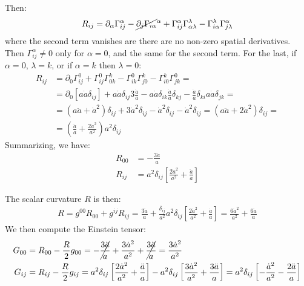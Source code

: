 \documentclass[../template.tex]{subfiles}
\begin{document}
Then:
\begin{align*}
    R_{ij} = \partial_\alpha \Gamma_{ij}^\alpha -\cancel{\partial_j \Gamma_{i \alpha}}^\alpha + \Gamma_{ij}^\alpha \Gamma_{\alpha \lambda}^\lambda - \Gamma_{i \alpha}^\lambda \Gamma_{j \lambda}^\alpha
\end{align*}
where the second term vanishes are there are no non-zero spatial derivatives. Then $\Gamma_{ij}^\alpha \neq 0$ only for $\alpha = 0$, and the same for the second term. For the last, if $\alpha = 0$, $\lambda = k$, or if $\alpha = k$ then $\lambda = 0$:
\begin{align*}
    R_{ij} &= \partial_0 \Gamma^0_{ij} + \Gamma_{ij}^0 \Gamma_{0k}^k - \Gamma_{ik}^0 \Gamma_{j0}^k - \Gamma_{i0}^k \Gamma_{jk}^0 = \\
    &= \partial_0 [a \dot{a} \delta_{ij}] + a \dot{a} \delta_{ij} 3 \frac{\dot{a}}{a} - a \dot{a} \delta_{ik} \frac{\dot{a}}{a} \delta_{kj} - \frac{\dot{a}}{a} \delta_{ki} a \dot{a} \delta_{jk} =\\
    &=(a\ddot{a} + \dot{a}^2) \delta_{ij} + 3 \dot{a}^2 \delta_{ij} - \dot{a}^2 \delta_{ij} - \dot{a}^2 \delta_{ij} = (a\ddot{a} +2\dot{a}^2) \delta_{ij} = \\
    &= \left(\frac{\ddot{a}}{a} + \frac{2 \dot{a}^2}{a^2}  \right) a^2 \delta_{ij}
\end{align*}      
Summarizing, we have:
\begin{align*}
    R_{00} &= -\frac{3 \ddot{a}}{a}\\
    R_{ij} &= a^2 \delta_{ij} \left[\frac{2 \dot{a}^2}{a^2} + \frac{\ddot{a}}{a}  \right] 
\end{align*}  

The scalar curvature $R$ is then:
\begin{align*}
    R = g^{00} R_{00} + g^{ij} R_{ij} = \frac{3\ddot{a}}{a} + \frac{\delta_{ij}}{a^2} a^2 \delta_{ij} \left[\frac{2\dot{a}^2}{a^2} + \frac{\ddot{a}}{a} \right]   = \frac{6\dot{a}^2}{a^2} + \frac{6 \ddot{a}}{a}  
\end{align*} 
We then compute the Einstein tensor:
\begin{align*}
    G_{00} &= R_{00} - \frac{R}{2} g_{00} = -\cancel{\frac{3\ddot{a}}{a} }+ \frac{3\dot{a}^2}{a^2} + \cancel{\frac{3\ddot{a}}{a}}  = \frac{3\dot{a}^2}{a^2}  \\
    G_{ij} &= R_{ij} - \frac{R}{2} g_{ij} = a^2 \delta_{ij} \left[\frac{2 \dot{a}^2}{a^2} + \frac{\ddot{a}}{a}  \right] - a^2 \delta_{ij}\left[\frac{3 \dot{a}^2}{a^2} + \frac{3 \ddot{a}}{a}  \right] = a^2 \delta_{ij}\left[-\frac{\dot{a}^2}{a^2}  - \frac{2\ddot{a}}{a} \right]
\end{align*}
\end{document}
